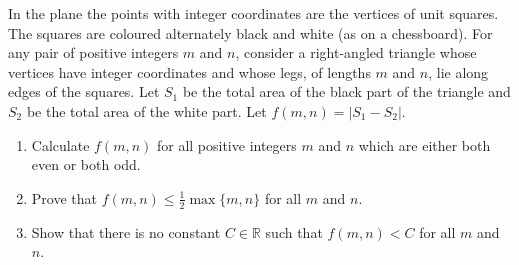 In the plane the points with 
integer coordinates are the vertices of unit squares. The squares are 
coloured alternately black and white (as on a chessboard). For any pair 
of positive integers $ m$ and $ n$,  consider a right-angled triangle whose vertices have integer coordinates and whose legs, of lengths $ m$ and $ n$,  lie along edges of the squares. Let $ S_1$ be the total area of the black part of the triangle and $ S_2$ be the total area of the white part. Let $ f(m,n) = | S_1 - S_2 |$.

\begin{enumerate}[label = (\alph*)]
	\item Calculate $ f(m,n)$ for all positive integers $ m$ and $ n$ which are either both even or both odd.
	\item Prove that $ f(m,n) \leq \frac 12 \max \{m,n \}$ for all $ m$ and $ n$.
	\item Show that there is no constant $ C\in\mathbb{R}$ such that $ f(m,n) < C$ for all $ m$ and $ n$.
\end{enumerate}
